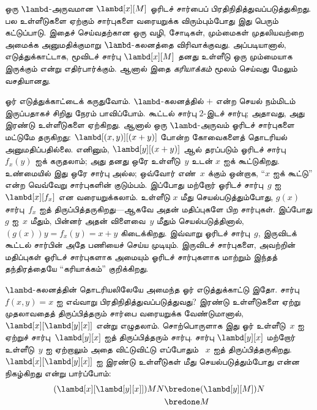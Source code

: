 \documentclass[../../../include/open-logic-section]{subfiles}
\begin{document}

ஒரு $\lambd$-அருவமான $\lambd[x][M]$ ஓரிடச் சார்பைப் பிரதிநிதித்துவப்படுத்துகிறது.
பல உள்ளீடுகளை ஏற்கும் சார்புகளை வரையறுக்க விரும்பும்போது இது பெரும் கட்டுப்பாடு.
இதைச் செய்வதற்கான ஒரு வழி, சோடிகள், மும்மைகள் முதலியவற்றை அமைக்க அனுமதிக்குமாறு
$\lambd$-கலனத்தை விரிவாக்குவது. அப்படியானால், எடுத்துக்காட்டாக, மூவிடச் சார்பு
$\lambd[x][M]$ தனது உள்ளீடு ஒரு மும்மையாக இருக்கும் என்று எதிர்பார்க்கும்.
ஆனால் இதை \emph{கரியாக்கம்} மூலம் செய்வது மேலும் வசதியானது.

ஓர் எடுத்துக்காட்டைக் கருதுவோம். $\lambd$-கலனத்தில் $+$ என்ற செயல் நம்மிடம்
இருப்பதாகச் சிறிது நேரம் பாவிப்போம். கூட்டல் சார்பு $2$-இடச் சார்பு; அதாவது,
அது இரண்டு உள்ளீடுகளை ஏற்கிறது. ஆனால் ஒரு $\lambd$-அருவம் ஓரிடச் சார்புகளை
மட்டுமே தருகிறது: $\lambd[(x,y)][(x+y)]$ போன்ற கோவைகளைத் தொடரியல் அனுமதிப்பதில்லை.
எனினும், $\lambd[y][(x+y)]$ ஆல் தரப்படும் ஓரிடச் சார்பு~$f_x(y)$ ஐக் கருதலாம்;
அது தனது ஒரே உள்ளீடு~$y$ உடன் $x$ ஐக் கூட்டுகிறது. உண்மையில் இது ஒரே சார்பு
அல்ல; ஒவ்வோர் எண்~$x$ க்கும் ஒன்றாக, ``$x$ ஐக் கூட்டு'' என்ற வெவ்வேறு
சார்புகளின் குடும்பம். இப்போது மற்றோர் ஓரிடச் சார்பு~$g$ ஐ $\lambd[x][f_x]$
என வரையறுக்கலாம். உள்ளீடு $x$ மீது செயல்படுத்தும்போது, $g(x)$ சார்பு~$f_x$ ஐத்
திருப்பித்தருகிறது---ஆகவே அதன் மதிப்புகளே பிற சார்புகள். இப்போது $g$ ஐ~$x$
மீதும், பின்னர் அதன் விளைவை~$y$ மீதும் செயல்படுத்தினால்,
$(g(x))y = f_x(y) = x+y$ கிடைக்கிறது. இவ்வாறு ஓரிடச் சார்பு~$g$, இருவிடக்
கூட்டல் சார்பின் அதே பணியைச் செய்ய முடியும். இருவிடச் சார்புகளை, அவற்றின்
மதிப்புகள் ஓரிடச் சார்புகளாக அமையும் ஓரிடச் சார்புகளாக மாற்றும் இந்தத்
தந்திரத்தையே ``கரியாக்கம்'' குறிக்கிறது.

$\lambd$-கலனத்தின் தொடரியலிலேயே அமைந்த ஓர் எடுத்துக்காட்டு இதோ. சார்பு
$f(x,y) = x$ ஐ எவ்வாறு பிரதிநிதித்துவப்படுத்துவது? இரண்டு உள்ளீடுகளை ஏற்று
முதலாவதைத் திருப்பித்தரும் சார்பை வரையறுக்க வேண்டுமானால்,
$\lambd[x][\lambd[y][x]]$ என்று எழுதலாம். சொற்பொருளாக இது ஓர் உள்ளீடு~$x$ ஐ
ஏற்றுச் சார்பு~$\lambd[y][x]$ ஐத் திருப்பித்தரும் சார்பு. சார்பு
$\lambd[y][x]$ மற்றோர் உள்ளீடு~$y$ ஐ ஏற்றாலும் அதை விட்டுவிட்டு எப்போதும்
~$x$ ஐத் திருப்பித்தருகிறது. $\lambd[x][\lambd[y][x]]$ ஐ இரண்டு உள்ளீடுகள்
மீது செயல்படுத்தும்போது என்ன நிகழ்கிறது என்று பார்ப்போம்:
\begin{align*}
  (\lambd[x][\lambd[y][x]])MN
  \bredone & (\lambd[y][M])N \\
  \bredone & M
\end{align*}
\end{document}

